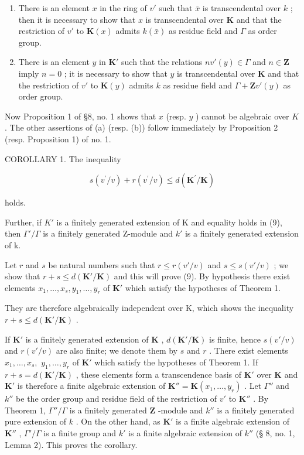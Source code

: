 \begin{enumerate}
\def\labelenumi{(\alph{enumi})}
\item
  There is an element \(x\) in the ring of \(v'\) such that \(\bar{x}\) is transcendental over \(k\) ; then it is necessary to show that \(x\) is transcendental over \(\mathbf{K}\) and that the restriction of \(v'\) to \(\mathbf{K}(x)\) admits \(k(\bar{x})\) as residue field and \(\Gamma\) as order group.
\item
  There is an element \(y\) in \(\mathbf{K}'\) such that the relations \(nv'(y) \in \Gamma\) and \(n \in \mathbf{Z}\) imply \(n = 0\) ; it is necessary to show that \(y\) is transcendental over \(\mathbf{K}\) and that the restriction of \(v'\) to \(\mathbf{K}(y)\) admits \(k\) as residue field and \(\Gamma + \mathbf{Z}v'(y)\) as order group.
\end{enumerate}

Now Proposition 1 of §8, no. 1 shows that \(x\) (resp. \(y\) ) cannot be algebraic over \(K\) . The other assertions of (a) (resp. (b)) follow immediately by Proposition 2 (resp. Proposition 1) of no. 1.

COROLLARY 1. The inequality

\[
s (v ^ {\prime} / v) + r (v ^ {\prime} / v) \leqslant d (\mathbf {K} ^ {\prime} / \mathbf {K})\tag{9}
\]

holds.

Further, if \(K'\) is a finitely generated extension of K and equality holds in (9), then \(\Gamma'/\Gamma\) is a finitely generated Z-module and \(k'\) is a finitely generated extension of k.

Let \(r\) and \(s\) be natural numbers such that \(r \leqslant r(v'/v)\) and \(s \leqslant s(v'/v)\) ; we show that \(r + s \leqslant d(\mathbf{K}'/\mathbf{K})\) and this will prove (9). By hypothesis there exist elements \(x_1, \ldots, x_s, y_1, \ldots, y_r\) of \(\mathbf{K}'\) which satisfy the hypotheses of Theorem 1.

They are therefore algebraically independent over K, which shows the inequality \(r + s \leqslant d(\mathbf{K}'/\mathbf{K})\) .

If \(\mathbf{K}'\) is a finitely generated extension of \(\mathbf{K}\) , \(d(\mathbf{K}' / \mathbf{K})\) is finite, hence \(s(v' / v)\) and \(r(v' / v)\) are also finite; we denote them by \(s\) and \(r\) . There exist elements \(x_{1},\ldots ,x_{s},\) \(y_{1},\ldots ,y_{r}\) of \(\mathbf{K}'\) which satisfy the hypotheses of Theorem 1. If \(r + s = d(\mathbf{K}' / \mathbf{K})\) , these elements form a transcendence basis of \(\mathbf{K}'\) over \(\mathbf{K}\) and \(\mathbf{K}'\) is therefore a finite algebraic extension of \(\mathbf{K}'' = \mathbf{K}(x_1,\dots,y_r)\) . Let \(\Gamma''\) and \(k''\) be the order group and residue field of the restriction of \(v'\) to \(\mathbf{K}''\) . By Theorem 1, \(\Gamma'' / \Gamma\) is a finitely generated \(\mathbf{Z}\) -module and \(k''\) is a finitely generated pure extension of \(k\) . On the other hand, as \(\mathbf{K}'\) is a finite algebraic extension of \(\mathbf{K}''\) , \(\Gamma' / \Gamma\) is a finite group and \(k'\) is a finite algebraic extension of \(k''\) (§ 8, no. 1, Lemma 2). This proves the corollary.

